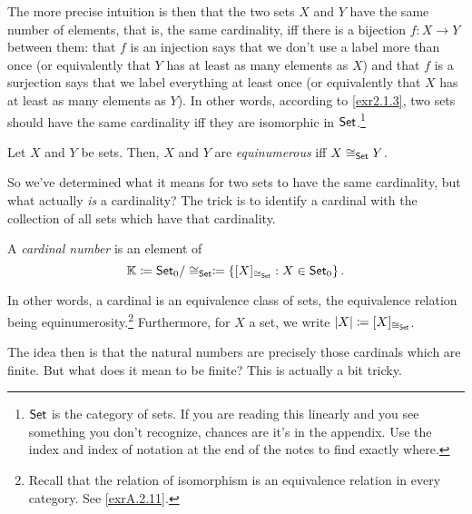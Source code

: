 The more precise intuition is then that the two sets $X$ and $Y$ have the same number of elements, that is, the same cardinality, iff there is a bijection $f:X\rightarrow Y$ between them:  that $f$ is an injection says that we don't use a label more than once (or equivalently that $Y$ has at least as many elements as $X$) and that $f$ is a surjection says that we label everything at least once (or equivalently that $X$ has at least as many elements as $Y$).  In other words, according to \cref{exr2.1.3}, two sets should have the same cardinality iff they are isomorphic in $\mathsf{Set}$.\footnote{$\mathsf{Set}$ is the category of sets.  If you are reading this linearly and you see something you don't recognize, chances are it's in the appendix.  Use the index and index of notation at the end of the notes to find exactly where.}
\begin{dfn}[Equinumerous]
Let $X$ and $Y$ be sets.  Then, $X$ and $Y$ are \emph{equinumerous} iff $X\cong _{\mathsf{Set}}Y$.
\end{dfn}

So we've determined what it means for two sets to have the same cardinality, but what actually \emph{is} a cardinality?  The trick is to identify a cardinal with the collection of all sets which have that cardinality.
\begin{dfn}\label{dfn1.1.2}
A \emph{cardinal number} is an element of
\begin{equation}
\mathbb{K} \coloneqq \mathsf{Set} _0/\cong _{\mathsf{Set}}\coloneqq \left\{ [X]_{\cong _{\mathsf{Set}}}:X\in \mathsf{Set} _0\right\} .
\end{equation}
\begin{rmk}
In other words, a cardinal is an equivalence class of sets, the equivalence relation being equinumerosity.\footnote{Recall that the relation of isomorphism is an equivalence relation in every category.  See \cref{exrA.2.11}.}  Furthermore, for $X$ a set, we write $\lvert X\rvert\coloneqq [X]_{\cong _{\mathsf{Set}}}$.
\end{rmk}
\end{dfn}

The idea then is that the natural numbers are precisely those cardinals which are finite.  But what does it mean to be finite?  This is actually a bit tricky.

